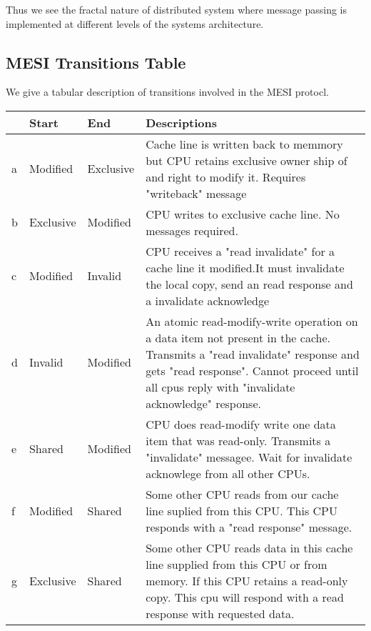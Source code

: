 \documentclass{article}
\begin{document}
Thus we see the fractal nature of distributed system where message
passing is implemented at different levels of the systems
architecture.


\subsection{MESI Transitions Table}

We give a tabular description of transitions involved in the MESI
protocl.


\begin{center}
\begin{tabular*}{0.75\textwidth} {| l | l | l | l| }    
    \hline
    & Start  & End   & Descriptions \\
    \hline
    a & Modified  & Exclusive &
    Cache line is written back to memmory but CPU retains exclusive 
    owner ship of and right to modify it. Requires "writeback" 
    message\\
    \hline
    b& Exclusive & Modified &  
    CPU writes to exclusive cache line. No messages required. \\
    \hline
    c & Modified & Invalid &   
    CPU receives a "read invalidate" for a cache line it modified.It 
    must invalidate the local copy, send an read response and a 
    invalidate acknowledge \\
    \hline
    d & Invalid & Modified &
    An atomic read-modify-write operation on a data item not present
    in the cache. Transmits a "read invalidate" response and gets
    "read response". Cannot proceed until all cpus reply with
    "invalidate acknowledge" response.    \\


    \hline
    e & Shared & Modified & 

    CPU does read-modify write one data item that was
    read-only. Transmits a "invalidate" messagee. Wait for invalidate
    acknowlege from all other CPUs.    
    \\
    \hline
    f & Modified & Shared &

    Some other CPU reads from our cache line suplied from this
    CPU. This CPU responds with a "read response" message.    
    \\    
    \hline

    g & Exclusive & Shared & 

    Some other CPU reads data in this cache line supplied from this
    CPU or from memory. If this CPU retains a read-only copy. This cpu
    will respond with a read response with requested data.
    

\end{tabular*}
\end{center}
\end{document}
